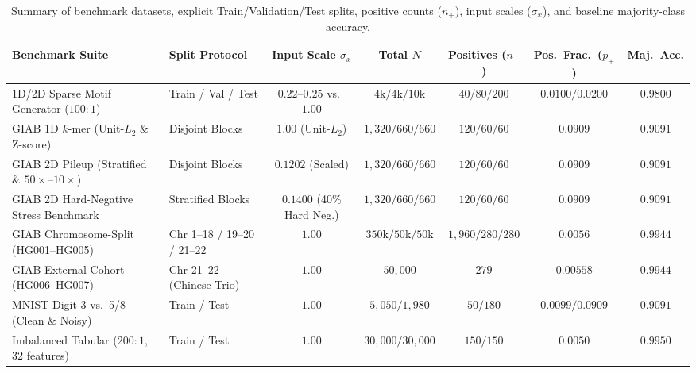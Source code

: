 \documentclass[10pt,a4paper]{article}
\begin{document}
\begin{table}[t]
\centering
\caption{Summary of benchmark datasets, explicit Train/Validation/Test splits, positive counts ($n_+$), input scales ($\sigma_x$), and baseline majority-class accuracy.}
\label{tab:datasets}
\footnotesize
\setlength{\tabcolsep}{4.5pt}
\renewcommand{\arraystretch}{1.05}
\begin{tabular}{llccccc}
\toprule
\textbf{Benchmark Suite} & \textbf{Split Protocol} & \textbf{Input Scale $\sigma_x$} & \textbf{Total $N$} & \textbf{Positives ($n_+$)} & \textbf{Pos.\ Frac.\ ($p_+$)} & \textbf{Maj.\ Acc.} \\
\midrule
1D/2D Sparse Motif Generator ($100:1$) & Train / Val / Test & $0.22$--$0.25$ vs.\ $1.00$ & $4\text{k} / 4\text{k} / 10\text{k}$ & $40 / 80 / 200$ & $0.0100 / 0.0200$ & $0.9800$ \\
GIAB 1D $k$-mer (Unit-$L_2$ \& Z-score) & Disjoint Blocks & $1.00$ (Unit-$L_2$) & $1,320 / 660 / 660$ & $120 / 60 / 60$ & $0.0909$ & $0.9091$ \\
GIAB 2D Pileup (Stratified \& $50\times$--$10\times$) & Disjoint Blocks & $0.1202$ (Scaled) & $1,320 / 660 / 660$ & $120 / 60 / 60$ & $0.0909$ & $0.9091$ \\
GIAB 2D Hard-Negative Stress Benchmark & Stratified Blocks & $0.1400$ (40\% Hard Neg.) & $1,320 / 660 / 660$ & $120 / 60 / 60$ & $0.0909$ & $0.9091$ \\
GIAB Chromosome-Split (HG001--HG005) & Chr 1--18 / 19--20 / 21--22 & $1.00$ & $350\text{k} / 50\text{k} / 50\text{k}$ & $1,960 / 280 / 280$ & $0.0056$ & $0.9944$ \\
GIAB External Cohort (HG006--HG007) & Chr 21--22 (Chinese Trio) & $1.00$ & $50,000$ & $279$ & $0.00558$ & $0.9944$ \\
MNIST Digit 3 vs.\ 5/8 (Clean \& Noisy) & Train / Test & $1.00$ & $5,050 / 1,980$ & $50 / 180$ & $0.0099 / 0.0909$ & $0.9091$ \\
Imbalanced Tabular ($200:1$, 32 features) & Train / Test & $1.00$ & $30,000 / 30,000$ & $150 / 150$ & $0.0050$ & $0.9950$ \\
\bottomrule
\end{tabular}
\end{table}
\end{document}
